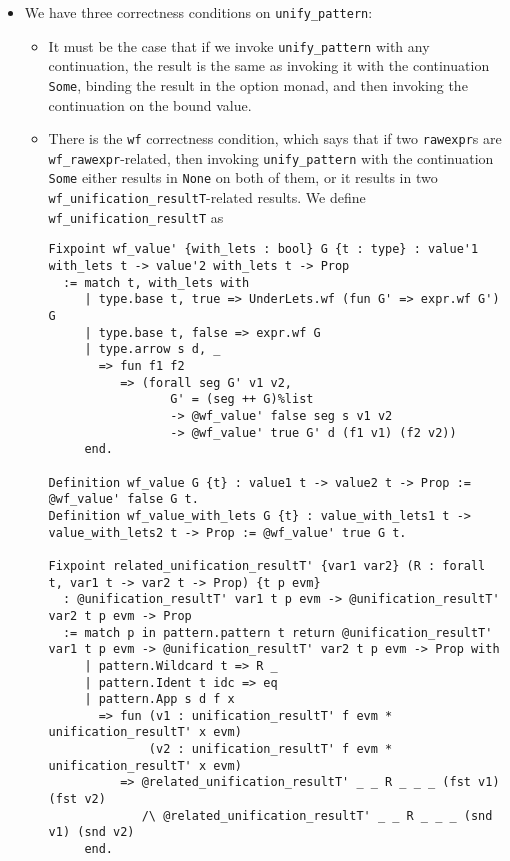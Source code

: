 \documentclass[
]{article}
\providecommand{\tightlist}{%
  \setlength{\itemsep}{0pt}\setlength{\parskip}{0pt}}
\begin{document}
\begin{itemize}
\begin{itemize}
\begin{itemize}
      \begin{itemize}
      \tightlist
      \item
        We have three correctness conditions on
        \texttt{unify\_pattern\textquotesingle{}}:

        \begin{itemize}
        \item
          It must be the case that if we invoke
          \texttt{unify\_pattern\textquotesingle{}} with any
          continuation, the result is the same as invoking it with the
          continuation \texttt{Some}, binding the result in the option
          monad, and then invoking the continuation on the bound value.
        \item
          There is the \texttt{wf} correctness condition, which says
          that if two \texttt{rawexpr}s are
          \texttt{wf\_rawexpr}-related, then invoking
          \texttt{unify\_pattern\textquotesingle{}} with the
          continuation \texttt{Some} either results in \texttt{None} on
          both of them, or it results in two
          \texttt{wf\_unification\_resultT\textquotesingle{}}-related
          results. We define
          \texttt{wf\_unification\_resultT\textquotesingle{}} as

\begin{verbatim}
Fixpoint wf_value' {with_lets : bool} G {t : type} : value'1 with_lets t -> value'2 with_lets t -> Prop
  := match t, with_lets with
     | type.base t, true => UnderLets.wf (fun G' => expr.wf G') G
     | type.base t, false => expr.wf G
     | type.arrow s d, _
       => fun f1 f2
          => (forall seg G' v1 v2,
                 G' = (seg ++ G)%list
                 -> @wf_value' false seg s v1 v2
                 -> @wf_value' true G' d (f1 v1) (f2 v2))
     end.

Definition wf_value G {t} : value1 t -> value2 t -> Prop := @wf_value' false G t.
Definition wf_value_with_lets G {t} : value_with_lets1 t -> value_with_lets2 t -> Prop := @wf_value' true G t.

Fixpoint related_unification_resultT' {var1 var2} (R : forall t, var1 t -> var2 t -> Prop) {t p evm}
  : @unification_resultT' var1 t p evm -> @unification_resultT' var2 t p evm -> Prop
  := match p in pattern.pattern t return @unification_resultT' var1 t p evm -> @unification_resultT' var2 t p evm -> Prop with
     | pattern.Wildcard t => R _
     | pattern.Ident t idc => eq
     | pattern.App s d f x
       => fun (v1 : unification_resultT' f evm * unification_resultT' x evm)
              (v2 : unification_resultT' f evm * unification_resultT' x evm)
          => @related_unification_resultT' _ _ R _ _ _ (fst v1) (fst v2)
             /\ @related_unification_resultT' _ _ R _ _ _ (snd v1) (snd v2)
     end.


\end{verbatim}
\end{itemize}
\end{itemize}
\end{itemize}
\end{itemize}
\end{itemize}
\end{document}
